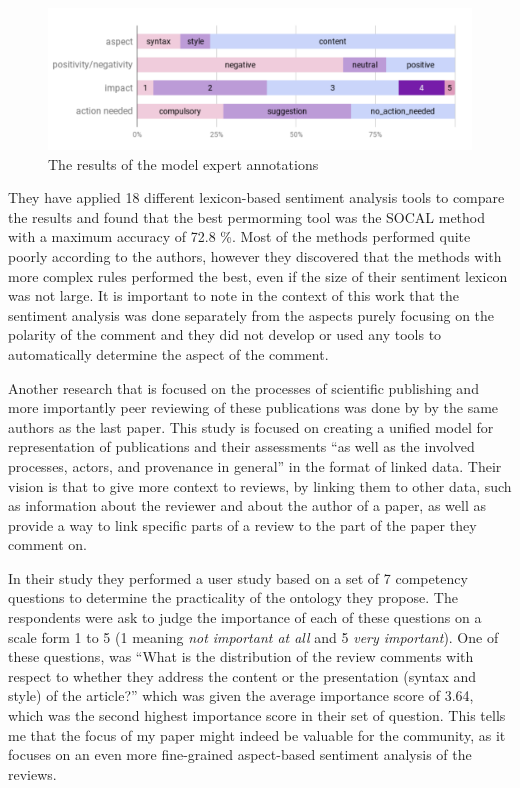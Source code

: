    \begin{figure}[htbp!]\centering
\includegraphics[width=.66\textwidth]{img/nano_annotations}
      \caption[The results of the model expert annotations]{The results of the model expert annotations\cite{nano_peer}}\label{img:annotations}
    \end{figure}
They have applied 18 different lexicon-based sentiment analysis tools to compare the results and found that the best permorming tool was the SOCAL method\cite{socal} with a maximum accuracy of 72.8 \%. Most of the methods performed quite poorly according to the authors, however they discovered that the methods with more complex rules performed the best, even if the size of their sentiment lexicon was not large. It is important to note in the context of this work that the sentiment analysis was done separately from the aspects purely focusing on the polarity of the comment and they did not develop or used any tools to automatically determine the aspect of the comment.

Another research that is focused on the processes of scientific publishing and more importantly peer reviewing of these publications was done by by the same authors as the last paper. This study is focused on creating a unified model for representation of publications and their assessments ``as well as the involved processes, actors, and provenance in general''\cite{nanopublications} in the format of linked data. Their vision is that to give more context to reviews, by linking them to other data, such as information about the reviewer and about the author of a paper, as well as provide a way to link specific parts of a review to the part of the paper they comment on.

In their study they performed a user study based on a set of 7 competency questions to determine the practicality of the ontology they propose. The respondents were ask to judge the importance of each of these questions on a scale form 1 to 5 (1 meaning \textit{not important at all} and 5 \textit{very important}). One of these questions,  was ``What is the distribution of the review comments with respect to whether
they address the content or the presentation (syntax and style) of the article?'' which was given the average importance score of 3.64, which was the second highest importance score in their set of question. This tells me that the focus of my paper might indeed be valuable for the community, as it focuses on an even more fine-grained aspect-based sentiment analysis of the reviews.
